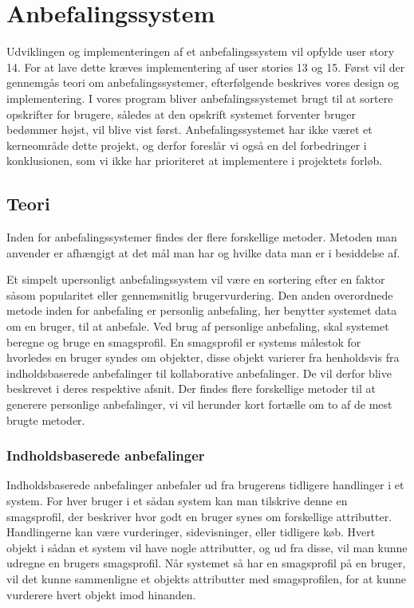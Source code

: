 \section{Anbefalingssystem}\label{anbefaling}
Udviklingen og implementeringen af et anbefalingssystem vil opfylde user story 14.
For at lave dette kræves implementering af user stories 13 og 15.
Først vil der gennemgås teori om anbefalingssystemer, efterfølgende beskrives vores design og implementering.
I vores program bliver anbefalingssystemet brugt til at sortere opskrifter for brugere, således at den opskrift systemet forventer bruger bedømmer højst, vil blive vist først. 
Anbefalingssystemet har ikke været et kerneområde dette projekt, og derfor foreslår vi også en del forbedringer i konklusionen, som vi ikke har prioriteret at implementere i projektets forløb.

\subsection{Teori}
Inden for anbefalingssystemer findes der flere forskellige metoder.
Metoden man anvender er afhængigt at det mål man har og hvilke data man er i besiddelse af.

Et simpelt upersonligt anbefalingssystem vil være en sortering efter en faktor såsom popularitet eller gennemsnitlig brugervurdering.
Den anden overordnede metode inden for anbefaling er personlig anbefaling, her benytter systemet data om en bruger, til at anbefale.
Ved brug af personlige anbefaling, skal systemet beregne og bruge en smagsprofil.
En smagsprofil er systems målestok for hvorledes en bruger syndes om objekter, disse objekt varierer fra henholdsvis fra indholdsbaserede anbefalinger til kollaborative anbefalinger.  
De vil derfor blive beskrevet i deres respektive afsnit. 
Der findes flere forskellige metoder til at generere personlige anbefalinger, vi vil herunder kort fortælle om to af de mest brugte metoder\citep{RecommenderSystems}.

\subsubsection{Indholdsbaserede anbefalinger}
Indholdsbaserede anbefalinger anbefaler ud fra brugerens tidligere handlinger i et system.
For hver bruger i et sådan system kan man tilskrive denne en smagsprofil, der beskriver hvor godt en bruger synes om forskellige attributter.
Handlingerne kan være vurderinger, sidevisninger, eller tidligere køb. 
Hvert objekt i sådan et system vil have nogle attributter, og ud fra disse, vil man kunne udregne en brugers smagsprofil.
Når systemet så har en smagsprofil på en bruger, vil det kunne sammenligne et objekts attributter med smagsprofilen, for at kunne vurderere hvert objekt imod hinanden.

